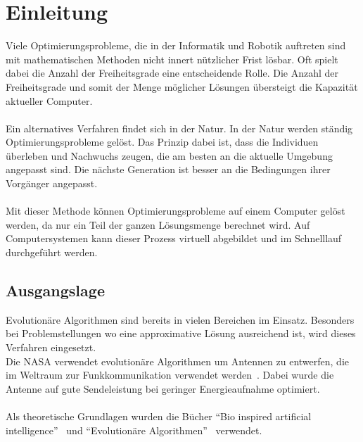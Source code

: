 %
%


\chapter{Einleitung}

  Viele Optimierungsprobleme,
  die in der Informatik und Robotik auftreten sind mit mathematischen Methoden nicht innert nützlicher Frist lösbar.
  Oft spielt dabei die Anzahl der Freiheitsgrade eine entscheidende Rolle.
  Die Anzahl der Freiheitsgrade und somit der Menge möglicher Lösungen übersteigt die Kapazität aktueller Computer.
  \\
  \\
  Ein alternatives Verfahren findet sich in der Natur. In der Natur werden ständig Optimierungsprobleme gelöst.
  Das Prinzip dabei ist, dass die Individuen überleben und Nachwuchs zeugen,
  die am besten an die aktuelle Umgebung angepasst sind.
  Die nächste Generation ist besser an die Bedingungen ihrer Vorgänger angepasst. %
  \\
  \\
  Mit dieser Methode können Optimierungsprobleme auf einem Computer gelöst werden,
  da nur ein Teil der ganzen Lösungsmenge berechnet wird.
  Auf Computersystemen kann dieser Prozess virtuell abgebildet und im Schnelllauf durchgeführt werden.

  \section{Ausgangslage}


    Evolutionäre Algorithmen sind bereits in vielen Bereichen im Einsatz.
    Besonders bei Problemstellungen wo eine approximative Lösung ausreichend ist,
    wird dieses Verfahren eingesetzt.
    \\
    Die NASA verwendet evolutionäre Algorithmen um Antennen zu entwerfen,
    die im Weltraum zur Funkkommunikation verwendet werden~\cite{Hornby2006}.
    Dabei wurde die Antenne auf gute Sendeleistung bei geringer Energieaufnahme optimiert.
    \\
    \\
    Als theoretische Grundlagen wurden die Bücher ``Bio inspired artificial intelligence''~\cite{book:bioInspired} und
    ``Evolutionäre Algorithmen''~\cite{book:evAlgo} verwendet.

